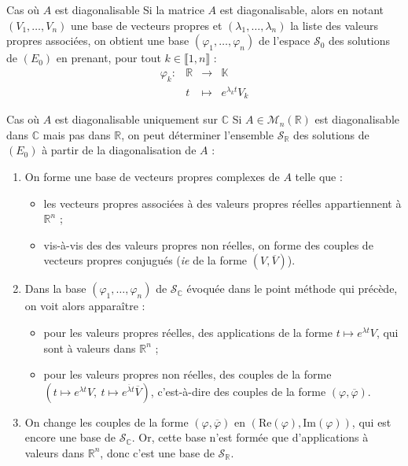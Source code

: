 \documentclass[french]{book}
\newcommand{\R}{\mathbb{R}}
\newcommand{\C}{\mathbb{C}}
\newcommand{\K}{\mathbb{K}}
\theoremstyle{plain}
\theoremstyle{definition}
\theoremstyle{remark}
\begin{document}
\begin{PM}{Cas où $A$ est diagonalisable} Si la matrice $A$ est diagonalisable, alors en notant $(V_1,\ldots,V_n)$ une base de vecteurs propres et $(\lambda_1,\ldots,\lambda_n)$ la liste des valeurs propres associées, on obtient une base $(\varphi_1,\ldots,\varphi_n)$ de l'espace $\mathcal{S}_0$ des solutions de $(E_0)$ en prenant, pour tout $k\in\llbracket1,n\rrbracket$ : $$\begin{array}{lrcl}
	\varphi_k:&\R&\longrightarrow&\K \\
	&t&\longmapsto&e^{\lambda_k t}V_k
\end{array}$$
\end{PM}
\begin{PM}{Cas où $A$ est diagonalisable uniquement sur $\C$} Si $A\in\mathcal{M}_n(\R)$ est diagonalisable dans $\C$ mais pas dans $\R$, on peut déterminer l'ensemble $\mathcal{S}_\R$ des solutions de $(E_0)$ à partir de la diagonalisation de $A$ :
\begin{enumerate}
	\item On forme une base de vecteurs propres complexes de $A$ telle que :
	\begin{itemize}
		\item les vecteurs propres associées à des valeurs propres réelles appartiennent à $\R^n$ ;
		\item vis-à-vis des des valeurs propres non réelles, on forme des couples de vecteurs propres conjugués (\textit{ie} de la forme $(V,\overline{V})$).
	\end{itemize}
	\item Dans la base $(\varphi_1,\ldots,\varphi_n)$ de $\mathcal{S}_\C$ évoquée dans le point méthode qui précède, on voit alors apparaître :
	\begin{itemize}
		\item pour les valeurs propres réelles, des applications de la forme $t\mapsto e^{\lambda t}V$, qui sont à valeurs dans $\R^n$ ;
		\item pour les valeurs propres non réelles, des couples de la forme $(t\mapsto e^{\lambda t}V,\ t\mapsto e^{\overline{\lambda} t}\overline{V})$, c'est-à-dire des couples de la forme $(\varphi,\overline{\varphi})$.
	\end{itemize}
	\item On change les couples de la forme $(\varphi,\overline{\varphi})$ en $(\text{Re}(\varphi),\text{Im}(\varphi))$, qui est encore une base de $\mathcal{S}_\C$. Or, cette base n'est formée que d'applications à valeurs dans $\R^n$, donc c'est une base de $\mathcal{S}_\R$.
\end{enumerate}
\end{PM}
\end{document}
